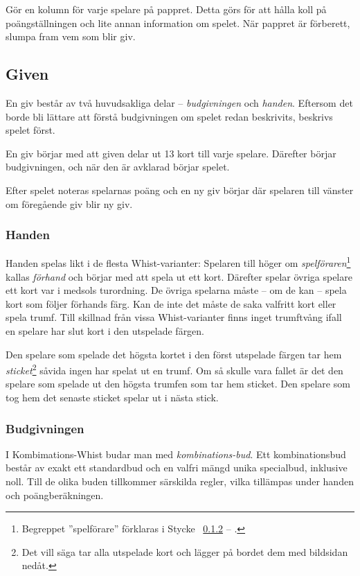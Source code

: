 \documentclass[a4paper]{article}
\renewcommand{\sectionref}[1]{%
	\ref{sec:#1} -- \nameref{sec:#1}%
}
\begin{document}
	Gör en kolumn för varje spelare på pappret. Detta görs för att hålla koll på poängställningen och lite annan information om spelet. När pappret är förberett, slumpa fram vem som blir giv.

	\subsection{Given}
	En giv består av två huvudsakliga delar -- \emph{budgivningen} och \emph{handen}. Eftersom det borde bli lättare att förstå budgivningen om spelet redan beskrivits, beskrivs spelet först.

	En giv börjar med att given delar ut 13 kort till varje spelare. Därefter börjar budgivningen, och när den är avklarad börjar spelet.

	Efter spelet noteras spelarnas poäng och en ny giv börjar där spelaren till vänster om föregående giv blir ny giv.

	\subsubsection{Handen}
	Handen spelas likt i de flesta Whist-varianter: Spelaren till höger om \emph{spelföraren}\footnote{Begreppet ''spelförare'' förklaras i Stycke~\sectionref{bidding}.} kallas \emph{förhand} och börjar med att spela ut ett kort. Därefter spelar övriga spelare ett kort var i medsols turordning. De övriga spelarna måste -- om de kan -- spela kort som följer förhands färg. Kan de inte det måste de saka valfritt kort eller spela trumf. Till skillnad från vissa Whist-varianter finns inget trumftvång ifall en spelare har slut kort i den utspelade färgen.

	Den spelare som spelade det högsta kortet i den först utspelade färgen tar hem \emph{sticket}\footnote{Det vill säga tar alla utspelade kort och lägger på bordet dem med bildsidan nedåt.} såvida ingen har spelat ut en trumf. Om så skulle vara fallet är det den spelare som spelade ut den högsta trumfen som tar hem sticket. Den spelare som tog hem det senaste sticket spelar ut i nästa stick.

	\subsubsection{Budgivningen}
	\label{sec:bidding}
	I Kombimations-Whist budar man med \emph{kombinations-bud}. Ett kombinationsbud består av exakt ett standardbud och en valfri mängd unika specialbud, inklusive noll. Till de olika buden tillkommer särskilda regler, vilka tillämpas under handen och poängberäkningen.
\end{document}
